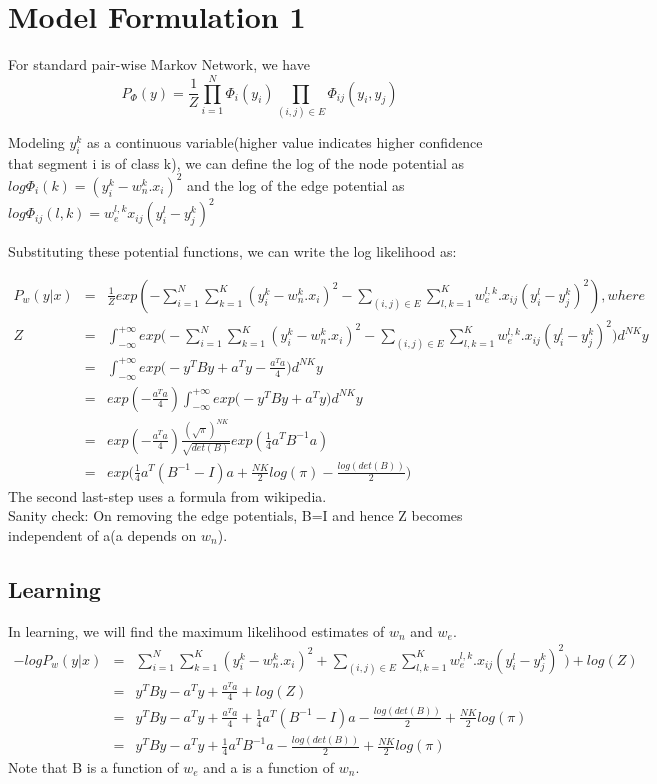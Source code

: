 \documentclass[11pt,a4paper,oneside]{report}
\begin{document}
\tableofcontents
\section{Model Formulation 1}
For standard pair-wise Markov Network, we have 
\begin{equation}
  P_\Phi (y) = \frac{1}{Z} \prod_{i=1}^{N} \Phi_i(y_i) \prod_{(i,j)\in E} \Phi_{ij}(y_i,y_j)
  \end{equation}

Modeling $y_i^k$ as a continuous variable(higher value indicates higher confidence that segment i is of class k), we can define the log of the node potential as 
$ log \Phi_i(k) = (y_i^k -  w_n^k.x_i )^2$  and the log of the edge potential as $ log \Phi_{ij}(l,k) = w_e^{l,k}x_{ij} ( y_i^l -  y_j^k)^2$

Substituting these potential functions, we can write the log likelihood as: 

\begin{eqnarray*}
P_w (y|x) &=& \frac{1}{Z}exp(-\sum_{i=1}^{N} \sum_{k=1}^{K} (y_i^k - w^{k}_{n}.x_{i})^2 - \sum_{(i,j)\in E} \sum_{l,k=1}^{K} w_{e}^{l,k}.x_{ij}(y_i^l - y_j^k)^2), where\\
Z&=&\int_{-\infty}^{+\infty }{exp \bigg( - \sum_{i=1}^{N} \sum_{k=1}^{K} (y_i^k - w^{k}_{n}.x_{i})^2 - \sum_{(i,j)\in E} \sum_{l,k=1}^{K} w_{e}^{l,k}.x_{ij}(y_i^l - y_j^k)^2 \bigg) } d^{NK}y\\
&=&\int_{-\infty}^{+\infty }{exp \bigg(-y^T B y+a^T y-\frac{a^Ta}{4}\bigg) } d^{NK}y\\
&=&exp(-\frac{a^Ta}{4})\int_{-\infty}^{+\infty }{exp \bigg(-y^T B y+a^T y\bigg) } d^{NK}y\\
&=&exp(-\frac{a^Ta}{4})\frac{(\sqrt{\pi})^{NK}}{\sqrt{det(B)}}exp(\frac{1}{4}a^T B^{-1} a)\\
&=&exp\bigg(\frac{1}{4}a^T (B^{-1}-I) a+\frac{NK}{2}log(\pi)-\frac{log(det(B))}{2}\bigg)
\end{eqnarray*}
The second last-step uses a formula from wikipedia. \\
Sanity check: On removing the edge potentials, B=I and hence Z becomes independent of a(a depends on $w_n$).
\subsection{Learning}
In learning, we will find the maximum likelihood estimates of $w_n$ and $w_e$.
\begin{eqnarray*}
-log P_w (y|x) &=& \sum_{i=1}^{N} \sum_{k=1}^{K} (y_i^k - w^{k}_{n}.x_{i})^2 + \sum_{(i,j)\in E} \sum_{l,k=1}^{K} w_{e}^{l,k}.x_{ij}(y_i^l - y_j^k)^2) +log(Z)\\
&=& y^T B y-a^T y+\frac{a^Ta}{4} +log(Z)\\
&=& y^T B y-a^T y +\frac{a^Ta}{4}+\frac{1}{4}a^T (B^{-1} -I)a-\frac{log(det(B))}{2}+\frac{NK}{2}log(\pi)\\
&=& y^T B y-a^T y +\frac{1}{4}a^T B^{-1}a-\frac{log(det(B))}{2}+\frac{NK}{2}log(\pi)
\end{eqnarray*}
Note that B is a function of $w_e$ and a is a function of $w_n$.
\end{document}
